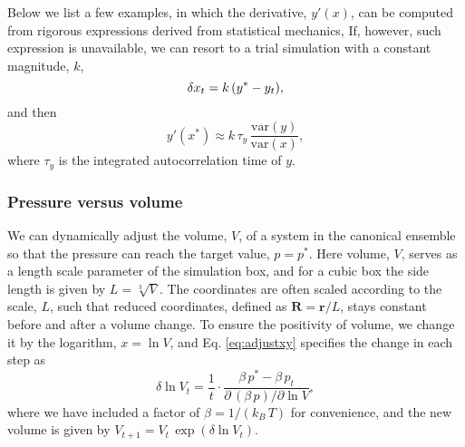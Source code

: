\documentclass[reprint]{revtex4-1}
\begin{document}
Below we list a few examples,
in which the derivative, $y'(x)$,
can be computed from rigorous expressions
derived from statistical mechanics,
%
If, however, such expression is unavailable,
we can resort to a trial simulation
with a constant magnitude, $k$,
%
\begin{equation}
  \delta x_t =
  k \, (y^* - y_t)
  ,
  \notag
\end{equation}
%
and then
%
\begin{equation}
  y'(x^*)
  \approx
  k \, \tau_y \,
  \frac{
    \mathrm{var} (y)
  }
  {
    \mathrm{var} (x)
  }
  ,
\end{equation}
%
where $\tau_y$ is the integrated autocorrelation time of $y$.



\subsubsection{Pressure versus volume}

We can dynamically adjust the volume, $V$, of a system
in the canonical ensemble
so that the pressure can reach the target value, $p = p^*$.
%
%
Here volume, $V$, serves as a length scale parameter
of the simulation box,
and for a cubic box
the side length is given by $L = \sqrt[3]{V}$.
%
The coordinates are often scaled according to the scale, $L$,
such that reduced coordinates, defined as
$\mathbf R = \mathbf r / L$,
stays constant before and after a volume change.
%
To ensure the positivity of volume,
we change it by the logarithm, $x = \ln V$,
and Eq. \eqref{eq:adjustxy} specifies
the change in each step as
$$
\delta \ln V_t
=
\frac{1}{t} \cdot
\frac{ \beta \, p^* - \beta \, p_t }
     { \partial \, ( \beta \, p) / \partial \ln V }
,
$$
where we have included a factor of $\beta = 1/(k_B \, T)$
for convenience,
and the new volume is given by $V_{t+1} = V_t \, \exp(\delta \ln V_t)$.
\end{document}
